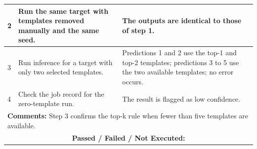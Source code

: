 \documentclass{FastFyp}
\begin{document}
{\begin{longtable}{|p{2.4cm}|p{4.6cm}|p{2.4cm}|p{3.8cm}|}
2 & Run the same target with templates removed manually and the same seed. & \multicolumn{2}{p{6.64cm}|}{The outputs are identical to those of step 1.} \\ \hline
3 & Run inference for a target with only two selected templates. & \multicolumn{2}{p{6.64cm}|}{Predictions 1 and 2 use the top-1 and top-2 templates; predictions 3 to 5 use the two available templates; no error occurs.} \\ \hline
4 & Check the job record for the zero-template run. & \multicolumn{2}{p{6.64cm}|}{The result is flagged as low confidence.} \\ \hline
\multicolumn{4}{|p{14.51cm}|}{\textbf{Comments:} Step 3 confirms the top-k rule when fewer than five templates are available.} \\ \hline
\multicolumn{4}{|c|}{\textbf{Passed / Failed / Not Executed:}} \\ \hline
\end{longtable}
}
\end{document}
